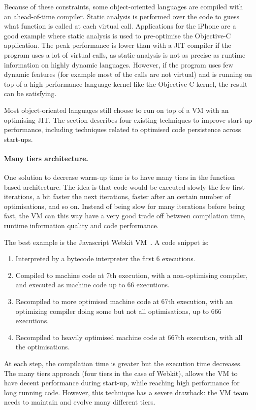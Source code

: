 \documentclass[a4paper,12pt,twoside]{../includes/ThesisStyle}
\begin{document}
Because of these constraints, some object-oriented languages are compiled with an ahead-of-time compiler. Static analysis is performed over the code to guess what function is called at each virtual call. Applications for the iPhone are a good example where static analysis is used to pre-optimise the Objective-C application. The peak performance is lower than with a JIT compiler if the program uses a lot of virtual calls, as static analysis is not as precise as runtime information on highly dynamic languages. However, if the program uses few dynamic features (for example most of the calls are not virtual) and is running on top of a high-performance language kernel like the Objective-C kernel, the result can be satisfying.

Most object-oriented languages still choose to run on top of a VM with an optimising JIT. The section describes four existing techniques to improve start-up performance, including techniques related to optimised code persistence across start-ups.

\paragraph{Many tiers architecture.}
One solution to decrease warm-up time is to have many tiers in the function based architecture. The idea is that code would be executed slowly the few first iterations, a bit faster the next iterations, faster after an certain number of optimisations, and so on. Instead of being slow for many iterations before being fast, the VM can this way have a very good trade off between compilation time, runtime information quality and code performance.

The best example is the Javascript Webkit VM~\cite{Webkit15}. A code snippet is:
\begin{enumerate}
\item Interpreted by a bytecode interpreter the first 6 executions.
\item Compiled to machine code at 7th execution, with a non-optimising compiler, and executed as machine code up to 66 executions.
\item Recompiled to more optimised machine code at 67th execution, with an optimizing compiler doing some but not all optimisations, up to 666 executions.
\item Recompiled to heavily optimised machine code at 667th execution, with all the optimisations.
\end{enumerate}

At each step, the compilation time is greater but the execution time decreases. The many tiers approach (four tiers in the case of Webkit), allows the VM to have decent performance during start-up, while reaching high performance for long running code. However, this technique has a severe drawback: the VM team needs to maintain and evolve many different tiers.
\end{document}
